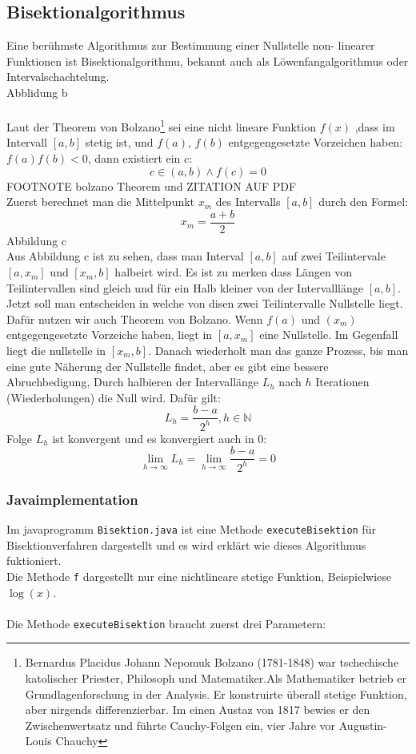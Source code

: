 \subsection{Bisektionalgorithmus}
Eine berühmste Algorithmus zur Bestimmung  einer Nullstelle non- linearer Funktionen ist Bisektionalgorithmu, bekannt auch als Löwenfangalgorithmus oder Intervalschachtelung.
\\
Abblidung b
\\
\\
Laut der Theorem von Bolzano\footnote{Bernardus Placidus Johann Nepomuk Bolzano (1781-1848) war tschechische katolischer Priester, Philosoph und Matematiker.Als Mathematiker betrieb er Grundlagenforschung in der Analysis. Er konstruirte überall stetige Funktion, aber nirgends differenzierbar.
Im einen Austaz von 1817 bewies er den Zwischenwertsatz und führte Cauchy-Folgen ein, vier Jahre vor Augustin- Louis Chauchy} sei eine nicht lineare  Funktion $f(x)$ ,dass im Intervall $[a,b]$ stetig ist,  
und  $f(a)$, $f(b)$ entgegengesetzte Vorzeichen haben: $f(a)f(b)<0$, dann existiert ein $c$:
$$c \in (a,b) \wedge f(c)=0$$ FOOTNOTE bolzano Theorem und ZITATION AUF PDF\\

Zuerst berechnet man die Mittelpunkt $x_m$ des Intervalls $[a,b]$ durch den Formel:
$$ x_m = \frac{a+b}{2}$$
Abbildung c
\\
Aus Abbildung c ist zu sehen, dass man Interval $[a,b]$ auf zwei Teilintervale $[a,x_m]$ und $[x_m,b]$ halbeirt wird. Es ist zu merken dass Längen von Teilintervallen sind gleich und für ein Halb kleiner von der Intervalllänge $[a,b]$. 
Jetzt soll man entscheiden in welche von disen zwei Teilintervalle Nullstelle liegt. Dafür nutzen wir auch Theorem von Bolzano. 
Wenn $f(a)$ und $(x_m)$ entgegengesetzte Vorzeiche haben, liegt in $[a,x_m]$ eine Nullstelle. Im Gegenfall liegt die nullstelle in $[x_m,b]$.
Danach wiederholt man das ganze  Prozess, bis man eine gute Näherung der Nullstelle findet, aber es gibt eine bessere Abruchbedigung, Durch halbieren der Intervallänge $L_h$ nach $h$ Iterationen (Wiederholungen) die Null wird. Dafür gilt:
$$L_h = \frac{b-a}{2^h}, h \in \mathbb{N}$$ Folge $L_h$ ist konvergent und es konvergiert auch in 0:
$$\lim_{h \to \infty}L_h = \lim_{h \to \infty}\frac{b-a}{2^h}=0$$

\subsubsection{Javaimplementation}
Im javaprogramm \verb|Bisektion.java| ist eine Methode \verb|executeBisektion| für Bisektionverfahren dargestellt und es wird erklärt wie dieses Algorithmus fuktioniert.\\
Die Methode \verb|f| dargestellt nur eine nichtlineare stetige Funktion, Beispielwiese $\log(x)$.
\\
\\
Die Methode \verb|executeBisektion| braucht zuerst drei Parametern:

